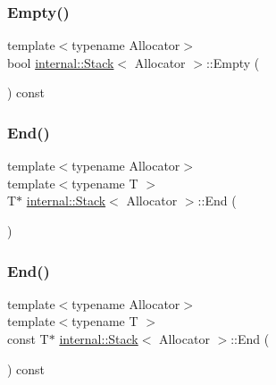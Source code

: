 \mbox{\label{classinternal_1_1Stack_a2b8bda380e33838a99e3c73ff9785f03}} 
\subsubsection{\texorpdfstring{Empty()}{Empty()}}
{\footnotesize\ttfamily template$<$typename Allocator$>$ \\
bool \hyperlink{classinternal_1_1Stack}{internal\+::\+Stack}$<$ Allocator $>$\+::Empty (\begin{DoxyParamCaption}{ }\end{DoxyParamCaption}) const\hspace{0.3cm}{\ttfamily [inline]}}

\mbox{\label{classinternal_1_1Stack_a54987ae8ad774dd3ee80a43d268ef080}} 
\subsubsection{\texorpdfstring{End()}{End()}\hspace{0.1cm}{\footnotesize\ttfamily [1/2]}}
{\footnotesize\ttfamily template$<$typename Allocator$>$ \\
template$<$typename T $>$ \\
T$\ast$ \hyperlink{classinternal_1_1Stack}{internal\+::\+Stack}$<$ Allocator $>$\+::End (\begin{DoxyParamCaption}{ }\end{DoxyParamCaption})\hspace{0.3cm}{\ttfamily [inline]}}

\mbox{\label{classinternal_1_1Stack_a605246623b39f9d36d3d12eee25f9d82}} 
\subsubsection{\texorpdfstring{End()}{End()}\hspace{0.1cm}{\footnotesize\ttfamily [2/2]}}
{\footnotesize\ttfamily template$<$typename Allocator$>$ \\
template$<$typename T $>$ \\
const T$\ast$ \hyperlink{classinternal_1_1Stack}{internal\+::\+Stack}$<$ Allocator $>$\+::End (\begin{DoxyParamCaption}{ }\end{DoxyParamCaption}) const\hspace{0.3cm}{\ttfamily [inline]}}

